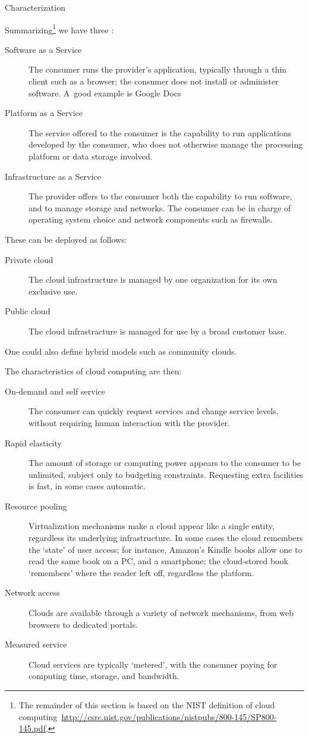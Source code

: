  {Characterization}

Summarizing\footnote{The remainder of this section is based on the
  NIST definition of cloud
  computing~\url{http://csrc.nist.gov/publications/nistpubs/800-145/SP800-145.pdf}.}
we have three :
\begin{description}
  \item[Software as a Service] The consumer runs the provider's
    application, typically through a thin client such as a browser;
    the consumer does not install or administer software.
    A~good example is Google Docs
\item[Platform as a Service] The service offered to the consumer is
  the capability to run applications developed by the consumer, who
  does not otherwise manage the processing platform or data storage
  involved.
\item[Infrastructure as a Service] The provider offers to the consumer
  both the capability to run software, and to manage storage and
  networks. The consumer can be in charge of operating system choice
  and network components such as firewalls.
\end{description}
These can be deployed as follows:
\begin{description}
  \item[Private cloud] The cloud infrastructure is managed by one organization for its own exclusive use.
  \item[Public cloud] The cloud infrastracture is managed for use by a broad customer base.
\end{description}
One could also define hybrid models such as community clouds.

The characteristics of cloud computing are then:
\begin{description}
  \item[On-demand and self service] The consumer can quickly request services
    and change service levels, without requiring human interaction with the provider.
  \item[Rapid elasticity] The amount of storage or computing power appears to the consumer
    to be unlimited, subject only to budgeting constraints. Requesting extra facilities
    is fast, in some cases automatic.
  \item[Resource pooling] Virtualization mechanisms make a cloud
    appear like a single entity, regardless its underlying
    infrastructure. In some cases the cloud remembers the `state' of
    user access; for instance, Amazon's Kindle books allow one to read
    the same book on a PC, and a smartphone; the cloud-stored book
    `remembers' where the reader left off, regardless the platform.
  \item[Network access] Clouds are available through a variety of
    network mechanisms, from web browsers to dedicated portals.
  \item[Measured service] Cloud services are typically `metered', with the consumer
    paying for computing time, storage, and bandwidth.
\end{description}

